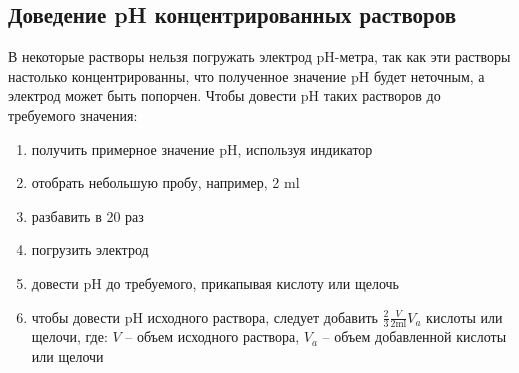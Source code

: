 \subsection{Доведение pH концентрированных растворов}
В некоторые растворы нельзя погружать электрод pH-метра,
так как эти растворы настолько концентрированны, что полученное значение pH будет неточным,
а электрод может быть попорчен.
Чтобы довести pH таких растворов до требуемого значения:
\begin{enumerate}
\item получить примерное значение pH, используя индикатор
\item отобрать небольшую пробу, например, 2 ml
\item разбавить в 20 раз
\item погрузить электрод
\item довести pH до требуемого, прикапывая кислоту или щелочь
\item чтобы довести pH исходного раствора, следует добавить
     $ \frac{2}{3} \frac{V}{2\text{ml}} V_a$ кислоты или щелочи, где:
     $ V $ -- объем исходного раствора,
     $ V_a $ -- объем добавленной кислоты или щелочи
\end{enumerate}

